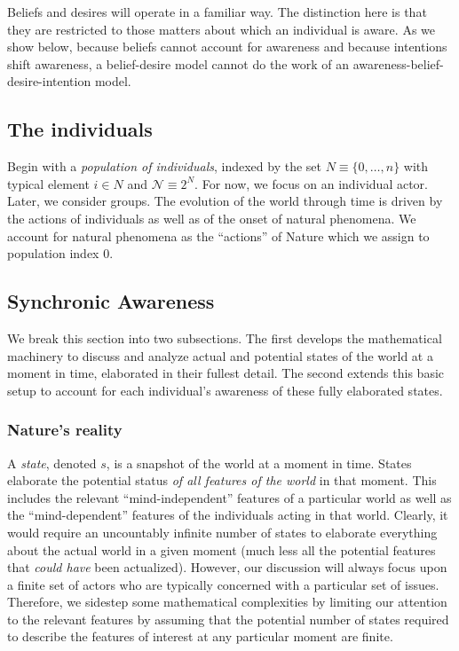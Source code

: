 \documentclass[
11pt,
titlepage,
reqno,
]{article}%
\theoremstyle{definition}
\begin{document}
	Beliefs and desires will operate in a familiar way. 
	The distinction here is that they are restricted to those matters about which an individual is aware.
	As we show below, because beliefs cannot account for awareness and because intentions shift awareness, a belief-desire model cannot do the work of an awareness-belief-desire-intention model.

	\subsection{The individuals}
	Begin with a \textit{population of individuals}, indexed by the set $N\equiv \{0,\ldots,n\}$ with typical element $i\in N$ and $\mathcal{N}\equiv 2^N$. For now, we focus on an individual actor. 
	Later, we consider groups. The evolution of the world through time is driven by the actions of individuals as well as of the onset of natural phenomena. 
	We account for natural phenomena as the ``actions'' of  Nature which we assign to population index 0.

	
	
	\subsection{Synchronic Awareness}\label{sec:synchronic_setup}

	We break this section into two subsections. The first develops the mathematical machinery to discuss and analyze actual and  potential states of the world at a moment in time, elaborated in their fullest detail. The second extends this basic setup to account for each individual's awareness of these fully elaborated states.  
	

	\subsubsection{Nature's reality\label{sec:states}}

	A \textit{state}, denoted $s$, is a snapshot of the world at a moment in time.
	States elaborate the potential status \textit{of all features of the world} in that moment. 
	This includes the relevant ``mind-independent'' features of a particular world as well as the ``mind-dependent'' features of the individuals acting in that world. 
	Clearly, it would require an uncountably infinite number of states to elaborate everything about the actual world in a given moment (much less all the potential features that \textit{could have} been actualized).
	However, our discussion will always focus upon a finite set of actors who are typically concerned with a particular set of issues.
	Therefore, we sidestep some mathematical complexities by limiting our attention to the relevant features by assuming that the potential number of states required to describe the features of interest at any particular moment are finite.
	
\end{document}
